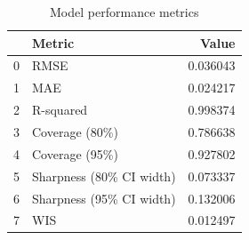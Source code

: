\begin{table}[htbp]
\caption{Model performance metrics}
\label{tab:metrics_summary}
\begin{tabular}{llr}
\toprule
 & Metric & Value \\
\midrule
0 & RMSE & 0.036043 \\
1 & MAE & 0.024217 \\
2 & R-squared & 0.998374 \\
3 & Coverage (80\%) & 0.786638 \\
4 & Coverage (95\%) & 0.927802 \\
5 & Sharpness (80\% CI width) & 0.073337 \\
6 & Sharpness (95\% CI width) & 0.132006 \\
7 & WIS & 0.012497 \\
\bottomrule
\end{tabular}
\end{table}
